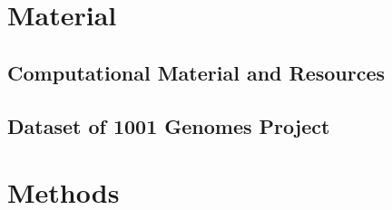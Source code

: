 \chapter{Material}
\section{Computational Material and Resources}
\section{Dataset of 1001 Genomes Project}
\chapter{Methods}